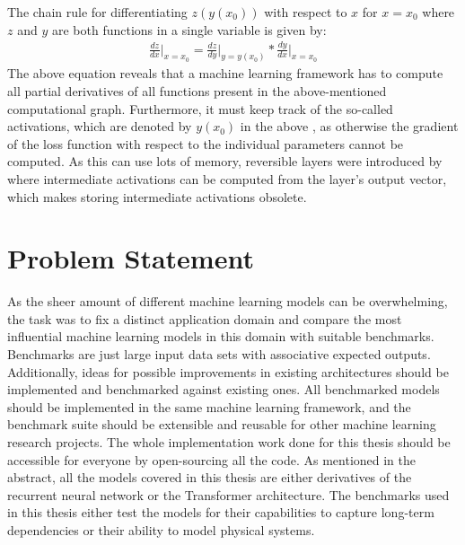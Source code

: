 \documentclass[draft,final]{vutinfth} %
\begin{document}
    The chain rule for differentiating $z(y(x_0))$ with respect to $x$ for $x=x_0$ where $z$ and $y$ are both functions in a single variable is given by:
    \begin{align}
        \label{chain_rule}
        \frac{dz}{dx} \Bigr\rvert_{x=x_0} = \frac{dz}{dy} \Bigr\rvert_{y=y(x_0)} * \frac{dy}{dx} \Bigr\rvert_{x=x_0}
    \end{align}
    The above equation reveals that a machine learning framework has to compute all partial derivatives of all functions present in the above-mentioned computational graph.
    Furthermore, it must keep track of the so-called activations, which are denoted by $y(x_0)$ in the above , as otherwise the gradient of the loss function with respect to the individual parameters cannot be computed.
    As this can use lots of memory, reversible layers were introduced by \cite{ReversibleLayer} where intermediate activations can be computed from the layer's output vector, which makes storing intermediate activations obsolete.


    \section{Problem Statement}
    As the sheer amount of different machine learning models can be overwhelming, the task was to fix a distinct application domain and compare the most influential machine learning models in this domain with suitable benchmarks.
    Benchmarks are just large input data sets with associative expected outputs.
    Additionally, ideas for possible improvements in existing architectures should be implemented and benchmarked against existing ones.
    All benchmarked models should be implemented in the same machine learning framework, and the benchmark suite should be extensible and reusable for other machine learning research projects.
    The whole implementation work done for this thesis should be accessible for everyone by open-sourcing all the code.
    As mentioned in the abstract, all the models covered in this thesis are either derivatives of the recurrent neural network or the Transformer \cite{Transformer} architecture.
    The benchmarks used in this thesis either test the models for their capabilities to capture long-term dependencies or their ability to model physical systems.
\end{document}
